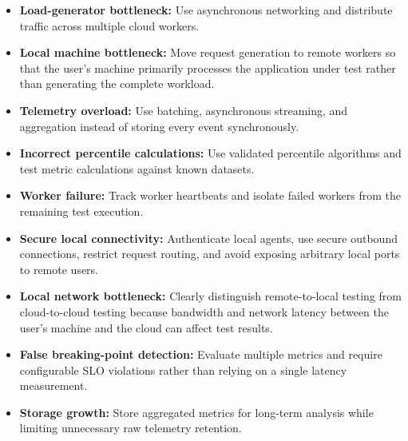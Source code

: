 \documentclass[11pt,a4paper]{article}
\begin{document}
\begin{itemize}[leftmargin=0.7cm]

    \item \textbf{Load-generator bottleneck:} Use asynchronous networking
    and distribute traffic across multiple cloud workers.

    \item \textbf{Local machine bottleneck:} Move request generation
    to remote workers so that the user's machine primarily processes
    the application under test rather than generating the complete
    workload.

    \item \textbf{Telemetry overload:} Use batching, asynchronous
    streaming, and aggregation instead of storing every event
    synchronously.

    \item \textbf{Incorrect percentile calculations:} Use validated
    percentile algorithms and test metric calculations against known
    datasets.

    \item \textbf{Worker failure:} Track worker heartbeats and isolate
    failed workers from the remaining test execution.

    \item \textbf{Secure local connectivity:} Authenticate local
    agents, use secure outbound connections, restrict request routing,
    and avoid exposing arbitrary local ports to remote users.

    \item \textbf{Local network bottleneck:} Clearly distinguish
    remote-to-local testing from cloud-to-cloud testing because
    bandwidth and network latency between the user's machine and the
    cloud can affect test results.

    \item \textbf{False breaking-point detection:} Evaluate multiple
    metrics and require configurable SLO violations rather than
    relying on a single latency measurement.

    \item \textbf{Storage growth:} Store aggregated metrics for
    long-term analysis while limiting unnecessary raw telemetry
    retention.

\end{itemize}

\end{document}
